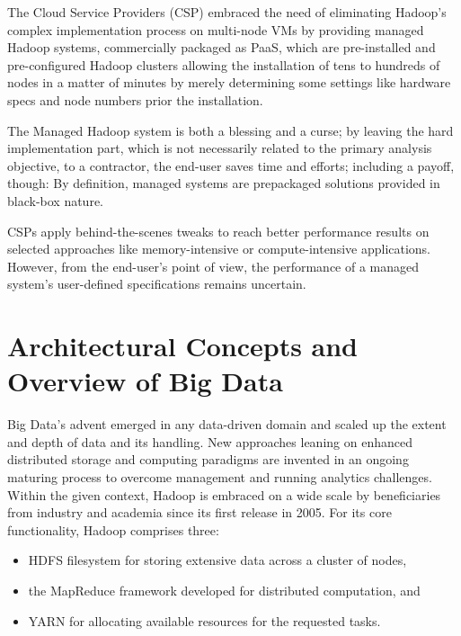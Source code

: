 \documentclass[review]{elsarticle}
\begin{document}
The Cloud Service Providers (CSP) embraced the need of eliminating Hadoop's complex implementation process on multi-node VMs by providing managed Hadoop systems, commercially packaged as PaaS, which are pre-installed and pre-configured Hadoop clusters allowing the installation of tens to hundreds of nodes in a matter of minutes by merely determining some settings like hardware specs and node numbers prior the installation. 

The Managed Hadoop system is both a blessing and a curse; by leaving the hard implementation part, which is not necessarily related to the primary analysis objective, to a contractor, the end-user saves time and efforts; including a payoff, though: By definition, managed systems are prepackaged solutions provided in black-box nature. 

CSPs apply behind-the-scenes tweaks to reach better performance results on selected approaches like memory-intensive or compute-intensive applications. However, from the end-user's point of view, the performance of a managed system's user-defined specifications remains uncertain.


\section{Architectural Concepts and Overview of Big Data} 	\label{sec:Background}

Big Data's advent emerged in any data-driven domain and scaled up the extent and depth of data and its handling. New approaches leaning on enhanced distributed storage and computing paradigms are invented in an ongoing maturing process to overcome management and running analytics challenges. Within the given context, Hadoop is embraced on a wide scale by beneficiaries from industry and academia since its first release in 2005.
For its core functionality, Hadoop comprises three:

\begin{itemize}
	\item HDFS filesystem for storing extensive data across a cluster of nodes,
	\item the MapReduce framework developed for distributed computation, and 
	\item YARN for allocating available resources for the requested tasks.
\end{itemize}
\end{document}
